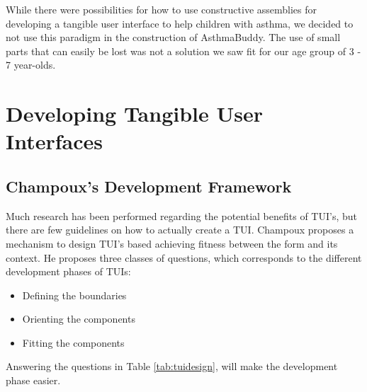 While there were possibilities for how to use constructive assemblies for developing a tangible user interface to help children with asthma, we decided to not use this paradigm in the construction of AsthmaBuddy. The use of small parts that can easily be lost was not a solution we saw fit for our age group of 3 - 7 year-olds.


\section{Developing Tangible User Interfaces}
\label{sec:developingtangibleinterfaces}

\subsection{Champoux's Development Framework}
\label{sec:champoux}
Much research has been performed regarding the potential benefits of TUI's, but there are few guidelines on how to actually create a TUI. Champoux proposes a mechanism to design TUI's based achieving fitness between the form and its context\cite{champoux2007design}.
He proposes three classes of questions, which corresponds to the different development phases of TUIs:
\begin{itemize}
  \item Defining the boundaries
  \item Orienting the components
  \item Fitting the components
\end{itemize} 


Answering the questions in Table \ref{tab:tuidesign}, will make the development phase easier.   


